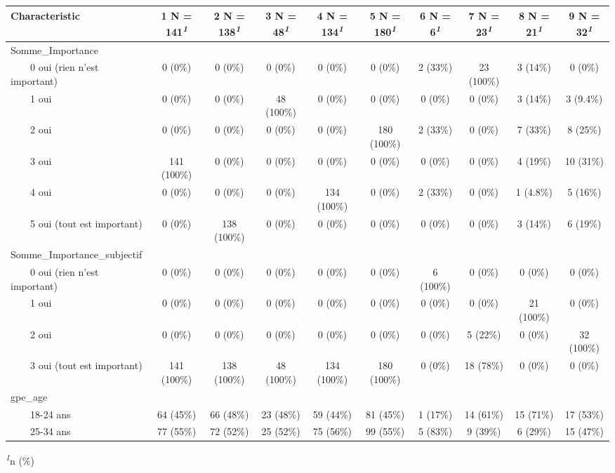 \documentclass[
]{article}
\begin{document}
\begin{table}[!t]
\fontsize{12.0pt}{14.4pt}\selectfont
\begin{tabular*}{\linewidth}{@{\extracolsep{\fill}}lccccccccc}
\toprule
\textbf{Characteristic} & \textbf{1}  N = 141\textsuperscript{\textit{1}} & \textbf{2}  N = 138\textsuperscript{\textit{1}} & \textbf{3}  N = 48\textsuperscript{\textit{1}} & \textbf{4}  N = 134\textsuperscript{\textit{1}} & \textbf{5}  N = 180\textsuperscript{\textit{1}} & \textbf{6}  N = 6\textsuperscript{\textit{1}} & \textbf{7}  N = 23\textsuperscript{\textit{1}} & \textbf{8}  N = 21\textsuperscript{\textit{1}} & \textbf{9}  N = 32\textsuperscript{\textit{1}} \\ 
\midrule\addlinespace[2.5pt]
Somme\_Importance &  &  &  &  &  &  &  &  &  \\ 
    0 oui (rien n’est important) & 0 (0\%) & 0 (0\%) & 0 (0\%) & 0 (0\%) & 0 (0\%) & 2 (33\%) & 23 (100\%) & 3 (14\%) & 0 (0\%) \\ 
    1 oui & 0 (0\%) & 0 (0\%) & 48 (100\%) & 0 (0\%) & 0 (0\%) & 0 (0\%) & 0 (0\%) & 3 (14\%) & 3 (9.4\%) \\ 
    2 oui & 0 (0\%) & 0 (0\%) & 0 (0\%) & 0 (0\%) & 180 (100\%) & 2 (33\%) & 0 (0\%) & 7 (33\%) & 8 (25\%) \\ 
    3 oui & 141 (100\%) & 0 (0\%) & 0 (0\%) & 0 (0\%) & 0 (0\%) & 0 (0\%) & 0 (0\%) & 4 (19\%) & 10 (31\%) \\ 
    4 oui & 0 (0\%) & 0 (0\%) & 0 (0\%) & 134 (100\%) & 0 (0\%) & 2 (33\%) & 0 (0\%) & 1 (4.8\%) & 5 (16\%) \\ 
    5 oui (tout est important) & 0 (0\%) & 138 (100\%) & 0 (0\%) & 0 (0\%) & 0 (0\%) & 0 (0\%) & 0 (0\%) & 3 (14\%) & 6 (19\%) \\ 
Somme\_Importance\_subjectif &  &  &  &  &  &  &  &  &  \\ 
    0 oui (rien n’est important) & 0 (0\%) & 0 (0\%) & 0 (0\%) & 0 (0\%) & 0 (0\%) & 6 (100\%) & 0 (0\%) & 0 (0\%) & 0 (0\%) \\ 
    1 oui & 0 (0\%) & 0 (0\%) & 0 (0\%) & 0 (0\%) & 0 (0\%) & 0 (0\%) & 0 (0\%) & 21 (100\%) & 0 (0\%) \\ 
    2 oui & 0 (0\%) & 0 (0\%) & 0 (0\%) & 0 (0\%) & 0 (0\%) & 0 (0\%) & 5 (22\%) & 0 (0\%) & 32 (100\%) \\ 
    3 oui (tout est important) & 141 (100\%) & 138 (100\%) & 48 (100\%) & 134 (100\%) & 180 (100\%) & 0 (0\%) & 18 (78\%) & 0 (0\%) & 0 (0\%) \\ 
gpe\_age &  &  &  &  &  &  &  &  &  \\ 
    18-24 ans & 64 (45\%) & 66 (48\%) & 23 (48\%) & 59 (44\%) & 81 (45\%) & 1 (17\%) & 14 (61\%) & 15 (71\%) & 17 (53\%) \\ 
    25-34 ans & 77 (55\%) & 72 (52\%) & 25 (52\%) & 75 (56\%) & 99 (55\%) & 5 (83\%) & 9 (39\%) & 6 (29\%) & 15 (47\%) \\ 
\bottomrule
\end{tabular*}
\begin{minipage}{\linewidth}
\textsuperscript{\textit{1}}n (\%)\\
\end{minipage}
\end{table}
\end{document}
